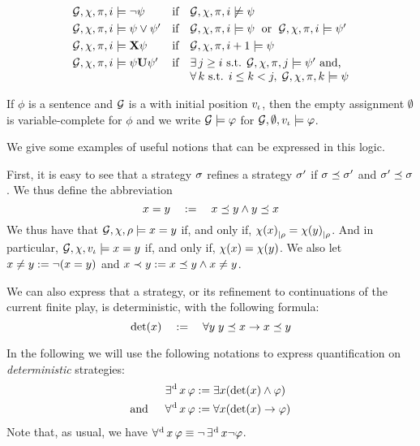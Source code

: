 \begin{definition}
\[\begin{array}{lcl}
   \CGS,\assign,\iplay,i\modelsSL \neg\psi & \text{if} &
  \CGS,\assign,\iplay,i\not\modelsSL\psi\\[3pt]
 \CGS,\assign,\iplay,i\modelsSL \psi\ou\psi' & \text{if} &
  \CGS,\assign,\iplay,i\modelsSL\psi \;\text{ or }\;
  \CGS,\assign,\iplay,i\modelsSL\psi' \\[3pt]
  \CGS,\assign,\iplay,i\modelsSL\X\psi & \text{if} &
  \CGS,\assign,\iplay,i+1\modelsSL\psi\\[3pt]
\CGS,\assign,\iplay,i\modelsSL\psi\until\psi' & \text{if} & \exists\, j\geq i
   \mbox{ s.t. }\CGS,\assign,\iplay,j\modelsSL \psi' \text{ and,}\\ 
   & & \forall\, k \text{ s.t. } i\leq k <j,
\; \CGS,\assign,\iplay,k\modelsSL \psi
\end{array}
\]
\endgroup
\end{definition}

If $\phi$ is a sentence and $\CGS$ is a \CGS with initial position
$v_{\iota}$, then the empty assignment $\emptyset$ is
variable-complete for $\phi$ and we write $\CGS\models\phi$ for
$\CGS,\emptyset,\pos_\init\models\phi$. 

We give some examples of useful notions that can be expressed in this
logic. 

\begin{example}
  First, it is easy to see that a strategy $\sigma$ refines a strategy
  $\sigma'$ if $\sigma \preceq \sigma'$ and
  $\sigma'\preceq\sigma$. We thus define the abbreviation
  \[x = y \quad := \quad x \preceq y \wedge y
    \preceq x\]
  We thus have that $\CGS,\assign,\fplay\models \var = \varb$ if, and
  only if, ${\chi(x)}_{|\rho}={\chi(y)}_{|\rho}$. And in
  particular, $\CGS,\assign,\pos_\init\models\var=\varb$ if, and only
  if, $\chi(x)=\chi(y)$.
  We also let $x \neq y := \neg (x = y)$ and
  $x\prec y := x \preceq y \wedge x \neq y$.
\end{example}

\begin{example}
  We can also express that a strategy, or its refinement to
  continuations of the current finite play, is deterministic, with the
  following formula:
  \[\text{det}(x) \quad := \quad \forall y \; y \preceq x \to x\preceq y\]
\end{example}

In the following we will use the following notations to express
quantification on \emph{deterministic} strategies:
\begin{align*}
\operatorname*{\exists^{\hskip.5pt\text{d}}}x\, \varphi & :=
\exists x (\text{det}(x) \wedge \varphi) \\
\text{and }\quad \operatorname*{\forall^{\hskip.5pt\text{d}}} x\, \varphi & := \forall x (\text{det}(x) \rightarrow \varphi)
\end{align*}
Note that, as usual, we have $\operatorname*{\forall^{\hskip.5pt\text{d}}} x\, \varphi \equiv \neg \operatorname*{\exists^{\hskip.5pt\text{d}}}x \neg \varphi$.

